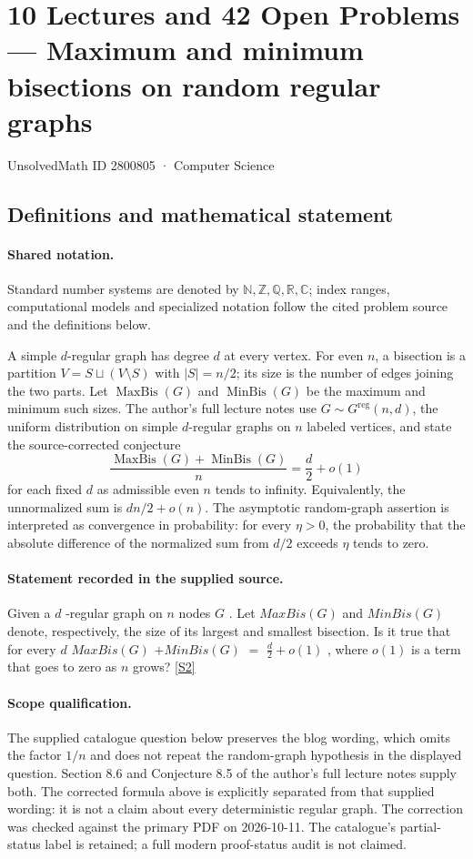 \documentclass[11pt]{article}
\newcommand{\sref}[2]{\hyperlink{source:#1:#2}{[S#2]}}
\begin{document}
\setcounter{section}{2800804}
\section{10 Lectures and 42 Open Problems — Maximum and minimum bisections on random regular graphs}\label{2800805}
{\small\sffamily UnsolvedMath ID 2800805 · Computer Science}
\subsection{Definitions and mathematical statement}

\paragraph{Shared notation.}Standard number systems are denoted by $\mathbb N,\mathbb Z,\mathbb Q,\mathbb R,\mathbb C$; index ranges, computational models and specialized notation follow the cited problem source and the definitions below.


A simple $d$-regular graph has degree $d$ at every vertex. For even $n$, a bisection is a partition $V=S\sqcup(V\setminus S)$ with $|S|=n/2$; its size is the number of edges joining the two parts. Let $\operatorname{MaxBis}(G)$ and $\operatorname{MinBis}(G)$ be the maximum and minimum such sizes. The author's full lecture notes use $G\sim G^{\mathrm{reg}}(n,d)$, the uniform distribution on simple $d$-regular graphs on $n$ labeled vertices, and state the source-corrected conjecture
\[
 \frac{\operatorname{MaxBis}(G)+\operatorname{MinBis}(G)}{n}
 =\frac d2+o(1)
\]
for each fixed $d$ as admissible even $n$ tends to infinity. Equivalently, the unnormalized sum is $dn/2+o(n)$. The asymptotic random-graph assertion is interpreted as convergence in probability: for every $\eta>0$, the probability that the absolute difference of the normalized sum from $d/2$ exceeds $\eta$ tends to zero.
\paragraph{Statement recorded in the supplied source.}
Given a $d$ -regular graph on $n$ nodes $G$ . Let $MaxBis(G)$ and $MinBis(G)$ denote, respectively, the size of its largest and smallest bisection. Is it true that for every $d$ $MaxBis(G)$ $+ MinBis(G)$ $=$ $\frac{d}{2} + o(1)$ , where $o(1)$ is a term that goes to zero as $n$ grows? \sref{2800805}{2}
\paragraph{Scope qualification.}
The supplied catalogue question below preserves the blog wording, which omits the factor $1/n$ and does not repeat the random-graph hypothesis in the displayed question. Section 8.6 and Conjecture 8.5 of the author's full lecture notes supply both. The corrected formula above is explicitly separated from that supplied wording: it is not a claim about every deterministic regular graph. The correction was checked against the primary PDF on 2026-10-11. The catalogue's partial-status label is retained; a full modern proof-status audit is not claimed.
\end{document}
